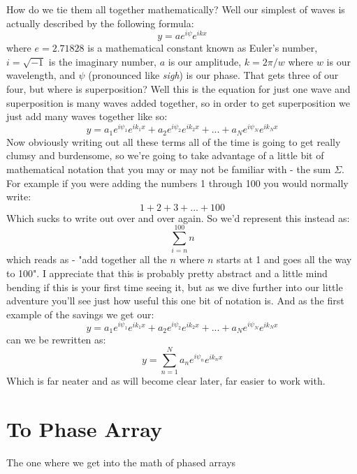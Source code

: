 \documentclass[10pt,a4paper]{article}
\begin{document}
How do we tie them all together mathematically? Well our simplest of waves is actually described by the following formula:
\begin{equation}
y=a e^{i\psi}e^{ikx}
\end{equation}
where $e=2.71828$ is a mathematical constant known as Euler's number, $i=\sqrt{-1}$ is the imaginary number, $a$ is our amplitude, $k=2\pi/w$ where $w$ is our wavelength, and $\psi$ (pronounced like \textit{sigh}) is our phase. That gets three of our four, but where is superposition? Well this is the equation for just one wave and superposition is many waves added together, so in order to get superposition we just add many waves together like so:
\begin{equation}
y = a_1 e^{i\psi_1}e^{ik_1x} + a_2 e^{i\psi_2}e^{ik_2x} + ... + a_N e^{i\psi_N}e^{ik_Nx}
\end{equation}
Now obviously writing out all these terms all of the time is going to get really clumsy and burdensome, so we're going to take advantage of a little bit of mathematical notation that you may or may not be familiar with - the sum $\Sigma$. For example if you were adding the numbers 1 through 100 you would normally write:
\begin{equation}
1 + 2 + 3 + ... + 100
\end{equation}
Which sucks to write out over and over again. So we'd represent this instead as:
\begin{equation}
\sum_{i=n}^{100}n
\end{equation}
which reads as - "add together all the $n$ where $n$ starts at 1 and goes all the way to 100". I appreciate that this is probably pretty abstract and a little mind bending if this is your first time seeing it, but as we dive further into our little adventure you'll see just how useful this one bit of notation is. And as the first example of the savings we get our:
\begin{equation}
y = a_1 e^{i\psi_1}e^{ik_1x} + a_2 e^{i\psi_2}e^{ik_2x} + ... + a_N e^{i\psi_N}e^{ik_Nx}
\end{equation}
can we be rewritten as:
\begin{equation}
y = \sum_{n=1}^{N}a_n e^{i\psi_n}e^{ik_nx}
\end{equation}
Which is far neater and as will become clear later, far easier to work with. 

\section{To Phase Array}
The one where we get into the math of phased arrays
\end{document}
